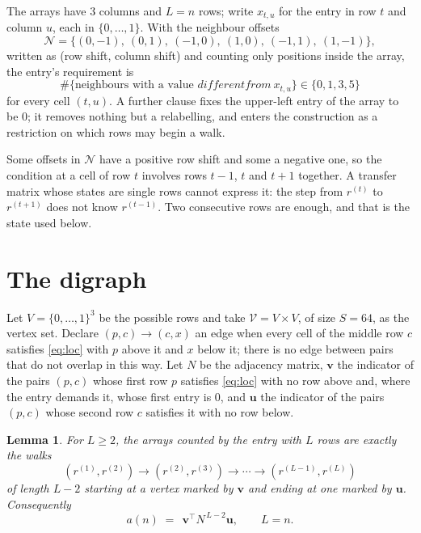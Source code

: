 \documentclass[11pt,a4paper]{article}
\theoremstyle{plain}
\newtheorem{lemma}[theorem]{Lemma}
\theoremstyle{definition}
\begin{document}
The arrays have $3$ columns and $L=n$ rows; write $x_{t,u}$ for the entry in
row $t$ and column $u$, each in $\{0,\dots,1\}$. With the neighbour offsets
\[
\mathcal N=\{(0,-1),\ (0,1),\ (-1,0),\ (1,0),\ (-1,1),\ (1,-1)\},
\]
written as (row shift, column shift) and counting only positions inside the array, the
entry's requirement is
\begin{equation}\label{eq:loc}
\#\{\text{neighbours with a value }different from\ x_{t,u}\}\in\{0,1,3,5\}
\end{equation}
for every cell $(t,u)$. A further clause fixes the upper-left entry of the array to be $0$; it removes nothing but a relabelling, and enters the construction as a restriction on which rows may begin a walk.

Some offsets in $\mathcal N$ have a positive row shift and some a negative one, so the
condition at a cell of row $t$ involves rows $t-1$, $t$ and $t+1$ together. A transfer
matrix whose states are single rows cannot express it: the step from $r^{(t)}$ to
$r^{(t+1)}$ does not know $r^{(t-1)}$. Two consecutive rows are enough, and that is
the state used below.

\section{The digraph}

Let $V=\{0,\dots,1\}^{3}$ be the possible rows and take
$\mathcal V=V\times V$, of size $S=64$, as the vertex set. Declare $(p,c)\to(c,x)$ an edge
when every cell of the middle row $c$ satisfies \eqref{eq:loc} with $p$ above it and $x$
below it; there is no edge between pairs that do not overlap in this way. Let $N$ be the
adjacency matrix, $\mathbf{v}$ the indicator of the pairs $(p,c)$ whose first row $p$
satisfies \eqref{eq:loc} with no row above and, where the entry demands it, whose first entry is $0$, and $\mathbf{u}$ the indicator of
the pairs $(p,c)$ whose second row $c$ satisfies it with no row below.

\begin{lemma}\label{lem:walk}
For $L\ge2$, the arrays counted by the entry with $L$ rows are exactly the walks
\[
(r^{(1)},r^{(2)})\to(r^{(2)},r^{(3)})\to\cdots\to(r^{(L-1)},r^{(L)})
\]
of length $L-2$ starting at a vertex marked by $\mathbf{v}$ and ending at one marked by
$\mathbf{u}$. Consequently
\[
a(n)\;=\;\,\mathbf{v}^{\!\top}N^{\,L-2}\mathbf{u},\qquad L=n .
\]
\end{lemma}
\end{document}
